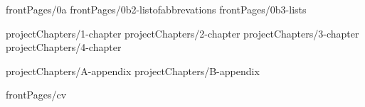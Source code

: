 \documentclass[a4paper,12pt,oneside,openany]{book}
\begin{document}
\onehalfspacing
{}

 {frontPages/0a}
 {frontPages/0b2-listofabbrevations}
 {frontPages/0b3-lists}

\onehalfspacing
\clearpage
{}

 {projectChapters/1-chapter}
 {projectChapters/2-chapter}
 {projectChapters/3-chapter}
 {projectChapters/4-chapter}

\newpage\appendix

 {projectChapters/A-appendix}
 {projectChapters/B-appendix}

\newpage
{}
\singlespacing
\printbibliography[title={\bibName}]

\ifnum{}
\newpage
 {frontPages/cv}
\fi
\end{document}
